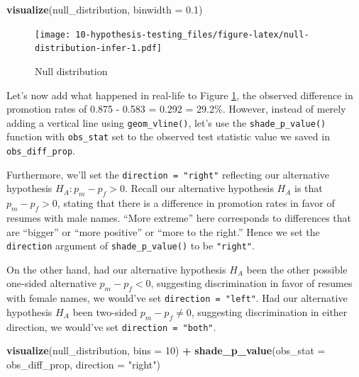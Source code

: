 \documentclass[
]{book}
\newenvironment{Shaded}{\begin{snugshade}}{\end{snugshade}}
\newcommand{\DataTypeTok}[1]{\textcolor[rgb]{0.13,0.29,0.53}{#1}}
\newcommand{\DecValTok}[1]{\textcolor[rgb]{0.00,0.00,0.81}{#1}}
\newcommand{\FloatTok}[1]{\textcolor[rgb]{0.00,0.00,0.81}{#1}}
\newcommand{\KeywordTok}[1]{\textcolor[rgb]{0.13,0.29,0.53}{\textbf{#1}}}
\newcommand{\NormalTok}[1]{#1}
\newcommand{\OperatorTok}[1]{\textcolor[rgb]{0.81,0.36,0.00}{\textbf{#1}}}
\newcommand{\StringTok}[1]{\textcolor[rgb]{0.31,0.60,0.02}{#1}}
\begin{document}
\begin{Shaded}
\begin{Highlighting}[]
\KeywordTok{visualize}\NormalTok{(null_distribution, }\DataTypeTok{binwidth =} \FloatTok{0.1}\NormalTok{)}
\end{Highlighting}
\end{Shaded}

\begin{figure}
\centering
\texttt{[image: 10-hypothesis-testing\_files/figure-latex/null-distribution-infer-1.pdf]}
\caption{\label{fig:null-distribution-infer}Null distribution}
\end{figure}

Let's now add what happened in real-life to Figure \ref{fig:null-distribution-infer}, the observed difference in promotion rates of 0.875 - 0.583 = 0.292 = 29.2\%. However, instead of merely adding a vertical line using \texttt{geom\_vline()}, let's use the  \texttt{shade\_p\_value()} function with \texttt{obs\_stat} set to the observed test statistic value we saved in \texttt{obs\_diff\_prop}.

Furthermore, we'll set the \texttt{direction\ =\ "right"} reflecting our alternative hypothesis \(H_A: p_{m} - p_{f} > 0\). Recall our alternative hypothesis \(H_A\) is that \(p_{m} - p_{f} > 0\), stating that there is a difference in promotion rates in favor of resumes with male names. ``More extreme'' here corresponds to differences that are ``bigger'' or ``more positive'' or ``more to the right.'' Hence we set the \texttt{direction} argument of \texttt{shade\_p\_value()} to be \texttt{"right"}.

On the other hand, had our alternative hypothesis \(H_A\) been the other possible one-sided alternative \(p_{m} - p_{f} < 0\), suggesting discrimination in favor of resumes with female names, we would've set \texttt{direction\ =\ "left"}. Had our alternative hypothesis \(H_A\) been two-sided \(p_{m} - p_{f} \neq 0\), suggesting discrimination in either direction, we would've set \texttt{direction\ =\ "both"}.

\begin{Shaded}
\begin{Highlighting}[]
\KeywordTok{visualize}\NormalTok{(null_distribution, }\DataTypeTok{bins =} \DecValTok{10}\NormalTok{) }\OperatorTok{+}\StringTok{ }
\StringTok{  }\KeywordTok{shade_p_value}\NormalTok{(}\DataTypeTok{obs_stat =}\NormalTok{ obs_diff_prop, }\DataTypeTok{direction =} \StringTok{"right"}\NormalTok{)}
\end{Highlighting}
\end{Shaded}
\end{document}
